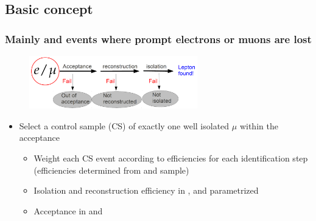 \documentclass{beamer}
\begin{document}
\subsection{Basic concept}
\begin{frame}
  \frametitle{Mainly \ttbar and \wpj events where prompt electrons or muons are lost}
   \begin{figure}
 \centering
  \includegraphics[width = 0.65\textwidth]{figures/lepton_veto_sketch.png}
 \end{figure}
      \begin{itemize}
      \item Select a control sample (CS) of exactly one well isolated $\mu$ within the acceptance
        \begin{itemize}
        \item Weight each CS event according to efficiencies for each identification step (efficiencies determined from \ttbar and \wpj sample)
        \item Isolation and reconstruction efficiency in \HT, \MHT and \NJets parametrized
        \item Acceptance in \MHT and \NJets
        \end{itemize}
      \end{itemize}
\end{frame}
\end{document}
